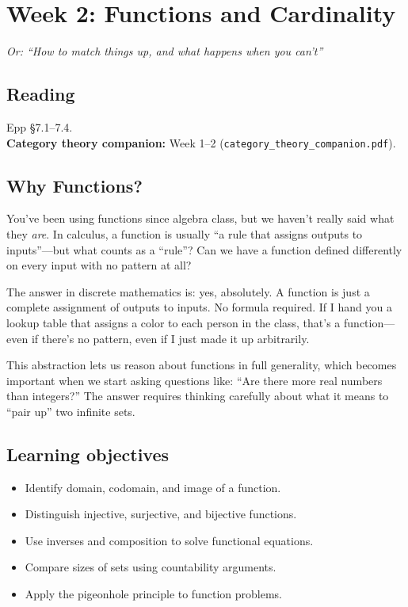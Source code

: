 \section{Week 2: Functions and Cardinality}

\textit{Or: ``How to match things up, and what happens when you can't''}

\subsection*{Reading}
Epp \S 7.1--7.4.\\
\textbf{Category theory companion:} Week 1--2 (\texttt{category\_theory\_companion.pdf}).

\subsection*{Why Functions?}

You've been using functions since algebra class, but we haven't really said what they \emph{are}. In calculus, a function is usually ``a rule that assigns outputs to inputs''---but what counts as a ``rule''? Can we have a function defined differently on every input with no pattern at all?

The answer in discrete mathematics is: yes, absolutely. A function is just a complete assignment of outputs to inputs. No formula required. If I hand you a lookup table that assigns a color to each person in the class, that's a function---even if there's no pattern, even if I just made it up arbitrarily.

This abstraction lets us reason about functions in full generality, which becomes important when we start asking questions like: ``Are there more real numbers than integers?'' The answer requires thinking carefully about what it means to ``pair up'' two infinite sets.

\subsection*{Learning objectives}
\begin{itemize}
  \item Identify domain, codomain, and image of a function.
  \item Distinguish injective, surjective, and bijective functions.
  \item Use inverses and composition to solve functional equations.
  \item Compare sizes of sets using countability arguments.
  \item Apply the pigeonhole principle to function problems.
\end{itemize}

